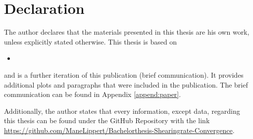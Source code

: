 \chapter*{Declaration}
\label{chap:declaration}

The author declares that the materials presented in this thesis are his own work, unless explicitly stated otherwise. This thesis is based on
\bigskip
\begin{itemize}
    \item [] 
\end{itemize}
\bigskip
and is a further iteration of this publication (brief communication). It provides additional plots and paragraphs that were included in the publication. The brief communication can be found in Appendix \ref{append:paper}.\bigskip

Additionally, the author states that every information, except data, regarding this thesis can be found under the GitHub Repository with the link \url{https://github.com/ManeLippert/Bachelorthesis-Shearingrate-Convergence}.